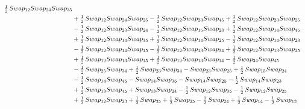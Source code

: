 \documentclass[10pt,a4paper]{amsart}
\begin{document}
\begin{align*}
        \tfrac12\,\textnormal{Swap}_{12} \textnormal{Swap}_{24} \textnormal{Swap}_{35}\\ & + \tfrac12\,\textnormal{Swap}_{12} \textnormal{Swap}_{24} \textnormal{Swap}_{25} - \tfrac12\,\textnormal{Swap}_{12} \textnormal{Swap}_{23} \textnormal{Swap}_{45} + \tfrac12\,\textnormal{Swap}_{12} \textnormal{Swap}_{23} \textnormal{Swap}_{25}\\ & -
        \tfrac12\,\textnormal{Swap}_{12} \textnormal{Swap}_{23} \textnormal{Swap}_{24} - \tfrac12\,\textnormal{Swap}_{12} \textnormal{Swap}_{15} \textnormal{Swap}_{23} + \tfrac12\,\textnormal{Swap}_{12} \textnormal{Swap}_{14} \textnormal{Swap}_{45}\\ & + \tfrac12\,\textnormal{Swap}_{12} \textnormal{Swap}_{14} \textnormal{Swap}_{35} +
        \tfrac12\,\textnormal{Swap}_{12} \textnormal{Swap}_{14} \textnormal{Swap}_{25} - \tfrac12\,\textnormal{Swap}_{12} \textnormal{Swap}_{14} \textnormal{Swap}_{23}\\ & - \tfrac12\,\textnormal{Swap}_{12} \textnormal{Swap}_{14} \textnormal{Swap}_{15} - \tfrac12\,\textnormal{Swap}_{12} \textnormal{Swap}_{13} \textnormal{Swap}_{34} +
        \tfrac12\,\textnormal{Swap}_{12} \textnormal{Swap}_{13} \textnormal{Swap}_{25}\\ & + \tfrac12\,\textnormal{Swap}_{12} \textnormal{Swap}_{13} \textnormal{Swap}_{15} + \tfrac12\,\textnormal{Swap}_{12} \textnormal{Swap}_{13} \textnormal{Swap}_{14} - \tfrac12\,\textnormal{Swap}_{34} \textnormal{Swap}_{45} \\ & -
        \tfrac12\,\textnormal{Swap}_{25} \textnormal{Swap}_{34} + \tfrac12\,\textnormal{Swap}_{23} \textnormal{Swap}_{34} - \textnormal{Swap}_{23} \textnormal{Swap}_{25} + \tfrac12\,\textnormal{Swap}_{15} \textnormal{Swap}_{24}\\ & - \tfrac12\,\textnormal{Swap}_{14} \textnormal{Swap}_{45} -
        \textnormal{Swap}_{14} \textnormal{Swap}_{35} - \textnormal{Swap}_{14} \textnormal{Swap}_{25} - \tfrac12\,\textnormal{Swap}_{14} \textnormal{Swap}_{23}\\ & + \tfrac12\,\textnormal{Swap}_{13} \textnormal{Swap}_{45} + \textnormal{Swap}_{13} \textnormal{Swap}_{24} - \tfrac12\,\textnormal{Swap}_{12} \textnormal{Swap}_{35} -
        \tfrac12\,\textnormal{Swap}_{12} \textnormal{Swap}_{25}\\ & + \tfrac12\,\textnormal{Swap}_{12} \textnormal{Swap}_{23} + \tfrac12\,\textnormal{Swap}_{35} + \tfrac12\,\textnormal{Swap}_{25} - \tfrac12\,\textnormal{Swap}_{24} + \tfrac12\,\textnormal{Swap}_{14} -
        \tfrac12\,\textnormal{Swap}_{13}\\

\end{align*}
\end{document}
